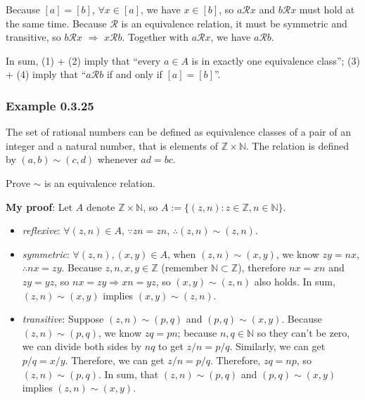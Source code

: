 \documentclass[12pt, letterpaper, oneside]{book}
\begin{document}
Because $[a] = [b]$, $\forall x \in [a]$, we have $x \in [b]$, so $a
  \mathcal{R} x$ and $b \mathcal{R} x$ must hold at the same time. Because
$\mathcal{R}$ is an equivalence relation, it must be symmetric and transitive,
so $b \mathcal{R} x$ $\Rightarrow$ $x \mathcal{R} b$. Together with $a
  \mathcal{R} x$, we have $a \mathcal{R} b$.

In sum, (1) + (2) imply that ``every $a \in A$ is in exactly one equivalence
class''; (3) + (4) imply that ``$a \mathcal{R} b$ if and only if $[a] = [b]$''.

\subsubsection{Example 0.3.25}

The set of rational numbers can be defined as equivalence classes of a pair of
an integer and a natural number, that is elements of $\mathbb{Z} \times
  \mathbb{N}$. The relation is defined by $(a, b) \sim (c, d)$ whenever $ad = bc$.

Prove $\sim$ is an equivalence relation.

\colorbox{lime!100}{\textbf{My proof}}: Let $A$ denote $\mathbb{Z} \times
  \mathbb{N}$, so $A := \{(z, n): z \in \mathbb{Z}, n \in \mathbb{N}\}$.

\begin{itemize}
  \item \textit{reflexive}: $\forall (z, n) \in A$, $\because zn = zn$,
        $\therefore (z, n) \sim (z, n)$.
  \item \textit{symmetric}: $\forall (z, n), (x, y) \in A$, when $(z, n) \sim
          (x, y)$, we know $zy = nx$, $\therefore nx = zy$. Because $z, n, x, y \in
          \mathbb{Z}$ (remember $\mathbb{N} \subset \mathbb{Z}$), therefore $nx = xn$
        and $zy = yz$, so $nx = zy \Rightarrow xn = yz$, so $(x, y) \sim (z, n)$
        also holds. In sum, $(z, n) \sim (x, y)$ implies $(x, y) \sim (z, n)$.
  \item \textit{transitive}: Suppose $(z, n) \sim (p, q)$ and $(p, q) \sim
          (x, y)$. Because $(z, n) \sim (p, q)$, we know $zq = pn$; because $n, q \in
          \mathbb{N}$ so they can't be zero, we can divide both sides by $nq$ to get
        $z/n = p/q$. Similarly, we can get $p/q = x/y$. Therefore, we can get $z/n
          = p/q$. Therefore, $zq = np$, so $(z, n) \sim (p, q)$. In sum, that $(z, n)
          \sim (p, q)$ and $(p, q) \sim (x, y)$ implies $(z, n) \sim (x, y)$.
\end{itemize}
\end{document}
